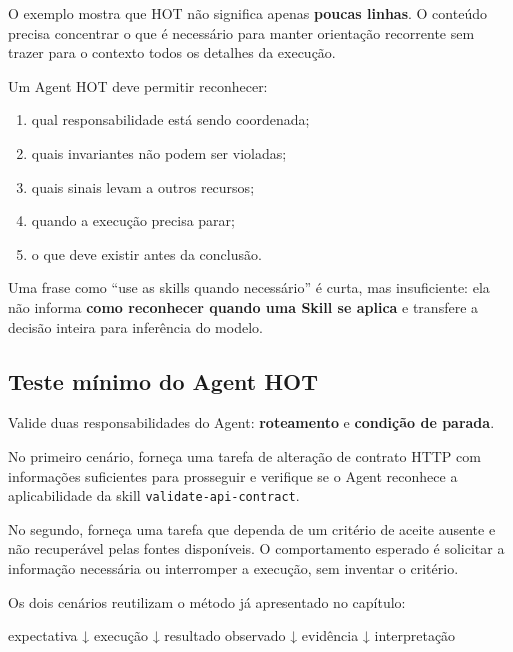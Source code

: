 \documentclass[
  10pt,
  a4paper,
  oneside]{book}
\newenvironment{Shaded}{}{}
\newcommand{\NormalTok}[1]{#1}
\providecommand{\tightlist}{%
  \setlength{\itemsep}{0pt}\setlength{\parskip}{0pt}}
\renewenvironment{Shaded}{\begin{snugshade}}{\end{snugshade}}%
\begin{document}
O exemplo mostra que HOT não significa apenas \textbf{poucas linhas}. O
conteúdo precisa concentrar o que é necessário para manter orientação
recorrente sem trazer para o contexto todos os detalhes da execução.

Um Agent HOT deve permitir reconhecer:

\begin{enumerate}
\def\labelenumi{\arabic{enumi}.}
\tightlist
\item
  qual responsabilidade está sendo coordenada;
\item
  quais invariantes não podem ser violadas;
\item
  quais sinais levam a outros recursos;
\item
  quando a execução precisa parar;
\item
  o que deve existir antes da conclusão.
\end{enumerate}

Uma frase como ``use as skills quando necessário'' é curta, mas
insuficiente: ela não informa \textbf{como reconhecer quando uma Skill
se aplica} e transfere a decisão inteira para inferência do modelo.

\hypertarget{teste-muxednimo-do-agent-hot}{%
\subsection{Teste mínimo do Agent
HOT}\label{teste-muxednimo-do-agent-hot}}

Valide duas responsabilidades do Agent: \textbf{roteamento} e
\textbf{condição de parada}.

No primeiro cenário, forneça uma tarefa de alteração de contrato HTTP
com informações suficientes para prosseguir e verifique se o Agent
reconhece a aplicabilidade da skill \texttt{validate-api-contract}.

No segundo, forneça uma tarefa que dependa de um critério de aceite
ausente e não recuperável pelas fontes disponíveis. O comportamento
esperado é solicitar a informação necessária ou interromper a execução,
sem inventar o critério.

Os dois cenários reutilizam o método já apresentado no capítulo:

\begin{Shaded}
\begin{Highlighting}[]
\NormalTok{expectativa}
\NormalTok{    ↓}
\NormalTok{execução}
\NormalTok{    ↓}
\NormalTok{resultado observado}
\NormalTok{    ↓}
\NormalTok{evidência}
\NormalTok{    ↓}
\NormalTok{interpretação}
\end{Highlighting}
\end{Shaded}
\end{document}
